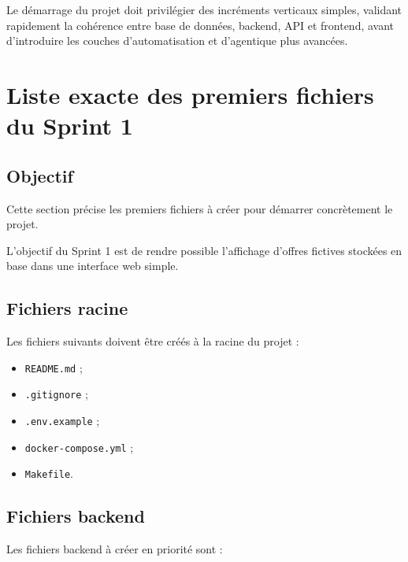 \documentclass[11pt,a4paper]{article}
\begin{document}
Le démarrage du projet doit privilégier des incréments verticaux simples, validant rapidement la cohérence entre base de données, backend, API et frontend, avant d’introduire les couches d’automatisation et d’agentique plus avancées.

\section{Liste exacte des premiers fichiers du Sprint 1}

\subsection{Objectif}

Cette section précise les premiers fichiers à créer pour démarrer concrètement le projet.

L’objectif du Sprint 1 est de rendre possible l’affichage d’offres fictives stockées en base dans une interface web simple.

\subsection{Fichiers racine}

Les fichiers suivants doivent être créés à la racine du projet :

\begin{itemize}
    \item \texttt{README.md} ;
    \item \texttt{.gitignore} ;
    \item \texttt{.env.example} ;
    \item \texttt{docker-compose.yml} ;
    \item \texttt{Makefile}.
\end{itemize}

\subsection{Fichiers backend}

Les fichiers backend à créer en priorité sont :
\end{document}
